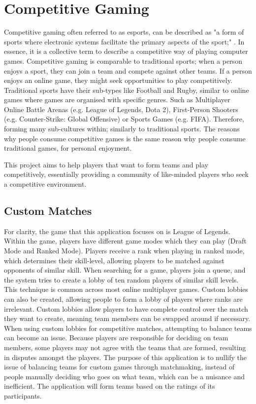 \section{Competitive Gaming}
Competitive gaming often referred to as esports, can be described as "a form of sports where electronic systems facilitate the primary aspects of the sport;" \cite{sjoblom2019esports}. In essence, it is a collective term to describe a competitive way of playing computer games. Competitive gaming is comparable to traditional sports; when a person enjoys a sport, they can join a team and compete against other teams. If a person enjoys an online game, they might seek opportunities to play competitively. Traditional sports have their sub-types like Football and Rugby, similar to online games where games are organised with specific genres. Such as Multiplayer Online Battle Arenas (e.g. League of Legends, Dota 2), First-Person Shooters (e.g. Counter-Strike: Global Offensive) or Sports Games (e.g. FIFA). Therefore, forming many sub-cultures within; similarly to traditional sports. The reasons why people consume competitive games is the same reason why people consume traditional games, for personal enjoyment.

This project aims to help players that want to form teams and play competitively, essentially providing a community of like-minded players who seek a competitive environment.
\subsection{Custom Matches}
For clarity, the game that this application focuses on is League of Legends.
Within the game, players have different game modes which they can play
(Draft Mode and Ranked Mode). Players receive a rank when playing in ranked mode, which determines their skill-level, allowing players to be matched against opponents of similar skill. When searching for a game, players join a queue, and the system tries to create a lobby of ten random players of similar skill levels. This technique is common across most online multiplayer games. Custom lobbies can also be created, allowing people to form a lobby of players where ranks are irrelevant. Custom lobbies allow players to have complete control over the match they want to create, meaning team members can be swapped around if necessary. When using custom lobbies for competitive matches, attempting to balance teams can become an issue. 
Because players are responsible for deciding on team members, some players may not agree with the teams that are formed, resulting in disputes amongst the players.
The purpose of this application is to nullify the issue of balancing teams for custom games through matchmaking, instead of people manually deciding who goes on what team, which can be a nuisance and inefficient. The application will form teams based on the ratings of its participants.

